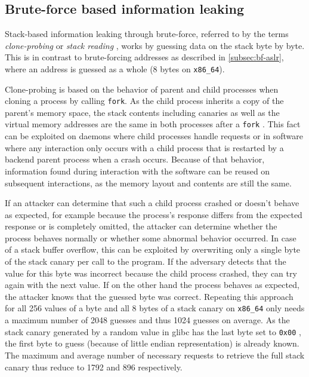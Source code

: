 \subsection{Brute-force based information leaking}
\label{subsec:bf-information-leaking}

Stack-based information leaking through brute-force, referred to by the terms \emph{clone-probing} \cite{Lu2016} or \emph{stack reading} \cite{Bittau2014}, works by guessing data on the stack byte by byte.
This is in contrast to brute-forcing addresses as described in \cref{subsec:bf-aslr}, where an address is guessed as a whole (8 bytes on \texttt{x86\_64}).

Clone-probing is based on the behavior of parent and child processes when cloning a process by calling \texttt{fork}.
As the child process inherits a copy of the parent's memory space, the stack contents including canaries as well as the virtual memory addresses are the same in both processes after a \texttt{fork} \cites[230]{Bittau2014}[1\psq]{Lu2016}{Kerrisk2020d}.
This fact can be exploited on daemons where child processes handle requests or in software where any interaction only occurs with a child process that is restarted by a backend parent process when a crash occurs.
Because of that behavior, information found during interaction with the software can be reused on subsequent interactions, as the memory layout and contents are still the same.

If an attacker can determine that such a child process crashed or doesn't behave as expected, for example because the process's response differs from the expected response or is completely omitted, the attacker can determine whether the process behaves normally or whether some abnormal behavior occurred.
In case of a stack buffer overflow, this can be exploited by overwriting only a single byte of the stack canary per call to the program.
If the adversary detects that the value for this byte was incorrect because the child process crashed, they can try again with the next value.
If on the other hand the process behaves as expected, the attacker knows that the guessed byte was correct.
Repeating this approach for all 256 values of a byte and all 8 bytes of a stack canary on \texttt{x86\_64} only needs a maximum number of 2048 guesses and thus 1024 guesses on average.
As the stack canary generated by a random value in \gls{glibc} has the last byte set to \texttt{0x00} \cite[\texttt{sysdeps/generic/dl-osinfo.h}]{FSF2020a}, the first byte to guess (because of little endian representation) is already known.
The maximum and average number of necessary requests to retrieve the full stack canary thus reduce to 1792 and 896 respectively.

